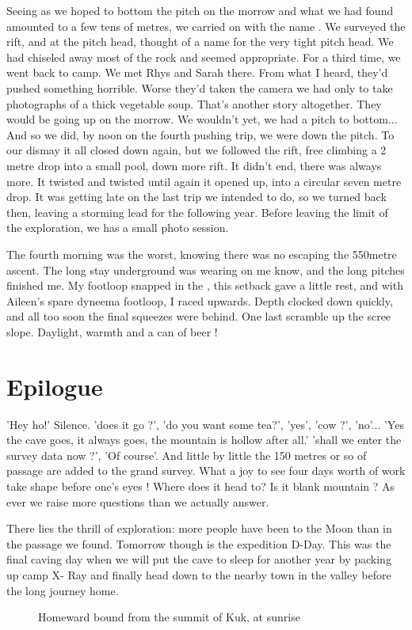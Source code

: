 Seeing as we hoped to bottom the pitch on the morrow and what we had found amounted to a few tens of metres, we carried on with the name . We surveyed the rift, and at the pitch head, thought of a name for the very tight pitch head. We had chiseled away most of the rock and  seemed appropriate.
For a third time, we went back to camp. We met Rhys and Sarah there. From what I heard, they'd pushed something horrible. Worse they'd taken the camera we had only to take photographs of a thick vegetable soup. That's another story altogether. They would be going up on the morrow. We wouldn't yet, we had a pitch to bottom...
And so we did, by noon on the fourth pushing trip, we were down the pitch. To our dismay it all closed down again, but we followed the rift, free climbing a 2 metre drop into a small pool, down more rift. It didn't end, there was always more. It twisted and twisted until again it opened up, into a circular seven metre drop. It was getting late on the last trip we intended to do, so we turned back then, leaving a storming lead for the following year. Before leaving the limit of the exploration, we has a small photo session.

The fourth morning was the worst, knowing there was no escaping the 550metre ascent. The long stay underground was wearing on me know, and the long pitches finished me. My footloop snapped in the , this setback gave a little rest, and with Aileen's spare dyneema footloop, I raced upwards. Depth clocked down quickly, and all too soon the final squeezes were behind. One last scramble up the scree slope. Daylight, warmth and a can of beer !

\section{Epilogue}
'Hey ho!' Silence. 'does it go ?', 'do you want some tea?', 'yes', 'cow ?', 'no'...
'Yes the cave goes, it always goes, the mountain is hollow after all.' 'shall we enter the survey data now ?', 'Of course'. And little by little the 150 metres or so of passage are added to the grand survey. What a joy to see four days worth of work take shape before one's eyes ! Where does it head to? Is it blank mountain ? As ever we raise more questions than we actually answer.

There lies the thrill of exploration: more people have been to the Moon than in the passage we found. Tomorrow though is the expedition D-Day. This was the final caving day when we will put the cave to sleep for another year by packing up camp X- Ray and finally head down to  the nearby town in the valley before the long journey home. 

\begin{figure}[b!]
\checkoddpage \ifoddpage \forcerectofloat \else \forceversofloat \fi
\centering
{}
\caption{Homeward bound from the summit of Kuk, at sunrise}
\label{the plateau}
\end{figure}
